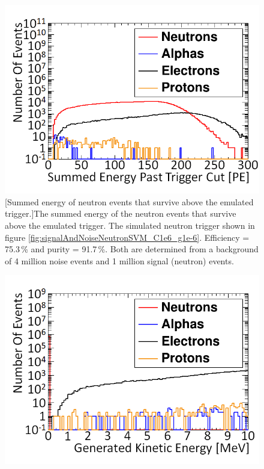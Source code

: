 \begin{figure}[!h]
\centering
\begin{minipage}{.45\textwidth}
  \centering
  \includegraphics[width=\linewidth]{Chapter4.5/Figs/summedEnergyPastTrigLogAdjust.png}
  [Summed energy of neutron events that survive above the emulated trigger.]{The summed energy of the neutron events that survive above the emulated trigger. The simulated neutron trigger shown in figure \ref{fig:signalAndNoiseNeutronSVM_C1e6_g1e-6}. Efficiency = 75.3\,\% and purity = 91.7\,\%. Both are determined from a background of 4 million noise events and 1 million signal (neutron) events.} 
  \label{fig:summedEnergyPastTriggerGdDicebox}
    \vspace{1.434cm} %
\end{minipage}%
\qquad
\begin{minipage}{.45\textwidth}
  \centering
  \includegraphics[width=\linewidth]{Chapter4.5/Figs/kineticEnergyPastTrigLogAdjust.png}

\end{minipage}
\end{figure}
